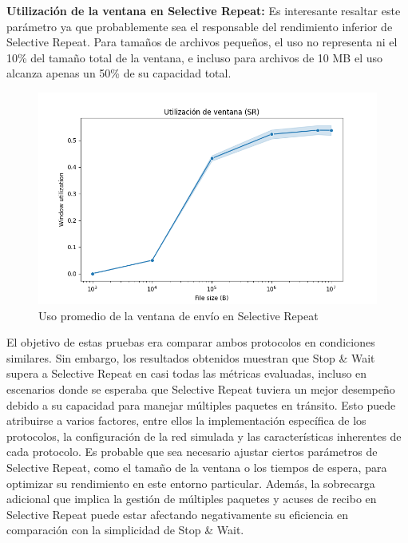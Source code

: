 \textbf{Utilización de la ventana en Selective Repeat:}
Es interesante resaltar este parámetro ya que probablemente sea el responsable del rendimiento inferior de Selective Repeat. Para tamaños de archivos pequeños, el uso no representa ni el 10\% del tamaño total de la ventana, e incluso para archivos de 10 MB el uso alcanza apenas un 50\% de su capacidad total.
\begin{figure}[H]
    \centering
    \includegraphics[width=1\linewidth]{images/upload_sender_window_utilization.png}
    \caption{Uso promedio de la ventana de envío en Selective Repeat}
    \label{fig:window_usage}
\end{figure}

El objetivo de estas pruebas era comparar ambos protocolos en condiciones similares. Sin embargo, los resultados obtenidos muestran que Stop \& Wait supera a Selective Repeat en casi todas las métricas evaluadas, incluso en escenarios donde se esperaba que Selective Repeat tuviera un mejor desempeño debido a su capacidad para manejar múltiples paquetes en tránsito. Esto puede atribuirse a varios factores, entre ellos la implementación específica de los protocolos, la configuración de la red simulada y las características inherentes de cada protocolo. Es probable que sea necesario ajustar ciertos parámetros de Selective Repeat, como el tamaño de la ventana o los tiempos de espera, para optimizar su rendimiento en este entorno particular. Además, la sobrecarga adicional que implica la gestión de múltiples paquetes y acuses de recibo en Selective Repeat puede estar afectando negativamente su eficiencia en comparación con la simplicidad de Stop \& Wait. 